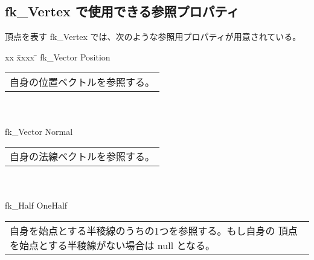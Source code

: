 \subsection{fk\_Vertex で使用できる参照プロパティ}
頂点を表す fk\_Vertex では、次のような参照用プロパティが用意されている。
\begin{tabbing}
xx \= xxxx \= \kill
\> fk\_Vector Position \\
	\> \> \begin{tabular}{p{15cm}}
		自身の位置ベクトルを参照する。
	\end{tabular} \\ \\

\> fk\_Vector Normal \\
	\> \> \begin{tabular}{p{15cm}}
		自身の法線ベクトルを参照する。
	\end{tabular} \\ \\

\> fk\_Half OneHalf \\
	\> \> \begin{tabular}{p{15cm}}
		自身を始点とする半稜線のうちの1つを参照する。もし自身の
		頂点を始点とする半稜線がない場合は null となる。
	\end{tabular}
\end{tabbing}

